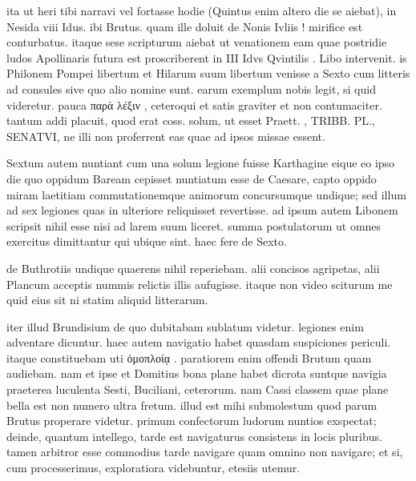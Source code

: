 


 ita ut heri tibi narravi vel fortasse hodie (Quintus enim altero die se aiebat), in Nesida viii Idus. ibi Brutus. quam ille doluit de Nonis Ivliis ! mirifice est conturbatus. itaque sese scripturum aiebat ut venationem eam quae postridie ludos Apollinaris futura est proscriberent in III Idvs Qvintilis . Libo intervenit. is Philonem Pompei libertum et Hilarum suum libertum venisse a Sexto cum litteris ad consules sive quo alio nomine sunt. earum exemplum nobis legit, si quid videretur. pauca παρὰ λέξιν , ceteroqui et satis graviter et non contumaciter. tantum addi placuit, quod erat coss. solum, ut esset Praett. , TRIBB. PL., SENATVI, ne illi non proferrent eas quae ad ipsos missae essent.

 Sextum autem nuntiant cum una solum legione fuisse Karthagine eique eo ipso die quo oppidum Baream cepisset nuntiatum esse de Caesare, capto oppido miram laetitiam commutationemque animorum concursumque undique; sed illum ad sex legiones quas in ulteriore reliquisset revertisse. ad ipsum autem Libonem scripsit nihil esse nisi ad larem suum liceret. summa postulatorum ut omnes exercitus dimittantur qui ubique sint. haec fere de Sexto.

 de Buthrotiis undique quaerens nihil reperiebam. alii concisos agripetas, alii Plancum acceptis nummis relictis illis aufugisse. itaque non video sciturum me quid eius sit ni statim aliquid litterarum.

 iter illud Brundisium de quo dubitabam sublatum videtur. legiones enim adventare dicuntur. haec autem navigatio habet quasdam suspiciones periculi. itaque constituebam uti ὁμοπλοίᾳ . paratiorem enim offendi Brutum quam audiebam. nam et ipse et Domitius bona plane habet dicrota suntque navigia praeterea luculenta Sesti, Buciliani, ceterorum. nam Cassi classem quae plane bella est non numero ultra fretum. illud est mihi submolestum quod parum Brutus properare videtur. primum confectorum ludorum nuntios exspectat; deinde, quantum intellego, tarde est navigaturus consistens in locis pluribus. tamen arbitror esse commodius tarde navigare quam omnino non navigare; et si, cum processerimus, exploratiora videbuntur, etesiis utemur.
